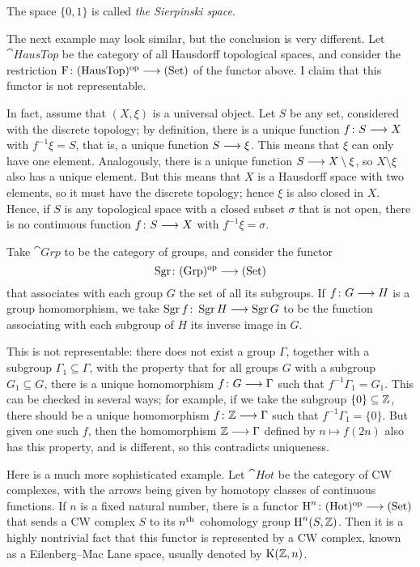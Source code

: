 \begin{2   CONTRAVARIANT FUNCTORS}
\begin{2.1 Yoneda Lemma}
\begin{enumeratei}
The space $\{0,1\}$ is called \emph{the Sierpinski space}.

\item\label{ex:notrep-opensubsets} The next example may look similar, but the conclusion is very different. Let $\cat{HausTop}$ be the category of all Hausdorff topological spaces, and consider the restriction  $\rF\colon \cat{HausTop}\op \arr \catset$ of the functor above. I claim that this functor is not representable. 

In fact, assume that $(X, \xi)$ is a universal object. Let $S$ be any set, considered with the discrete topology; by definition, there is a unique function $f \colon S \arr X$ with $f^{-1} \xi = S$, that is, a unique function $S \arr \xi$. This means that $\xi$ can only have one element. Analogously, there is a unique function $S \arr X \setminus \xi$, so $X \setminus \xi$ also has a unique element. But this means that $X$ is a Hausdorff space with two elements, so it  must have the discrete topology; hence $\xi$ is also closed in $X$. Hence, if $S$ is any topological space with a closed subset $\sigma$ that is not open, there is no continuous function $f\colon S \arr X$ with $f^{-1}{\xi} = \sigma$.

\item Take $\cat{Grp}$ to be the category of groups, and consider the functor 
   \[
   \operatorname{Sgr} \colon \cat{Grp}\op \arr \catset
   \]
that associates with each group $G$ the set of all its subgroups. If $f \colon G \arr H$ is a group homomorphism, we take $\operatorname{Sgr} f \colon \operatorname{Sgr} H \arr \operatorname{Sgr} G$ to be the function associating with each subgroup of $H$ its inverse image in $G$.

This is not representable: there does not exist a group $\Gamma$, together with a subgroup $\Gamma_1 \subseteq \Gamma$, with the property that for all groups $G$ with a subgroup $G_1 \subseteq G$, there is a unique homomorphism $f \colon G \arr \Gamma$ such that $f^{-1} \Gamma_1 = G_1$. This can be checked in several ways; for example, if we take the subgroup $\{0\} \subseteq \mathbb{Z}$, there should be a unique homomorphism $f \colon \ZZ \arr \Gamma$ such that $f ^{-1} \Gamma_1 = \{0\}$. But given one such $f$, then the homomorphism $\ZZ \arr \Gamma$ defined by $n \mapsto f(2n)$ also has this property, and is different, so this contradicts uniqueness.

\item Here is a much more sophisticated example. Let $\cat{Hot}$ be the category of CW complexes, with the arrows being given by homotopy classes of continuous functions. If $n$ is a fixed natural number, there is a functor $\H^n \colon \cat{Hot}\op \arr \catset$ that sends a CW complex $S$ to its $n^\text{th}$ cohomology group $\operatorname{H}^n(S, \mathbb{Z})$. Then it is a highly nontrivial fact that this functor is represented by a CW complex, known as a Eilenberg--Mac Lane space, usually denoted by $\mathrm{K}( \mathbb{Z}, n)$.


\end{enumeratei}
\end{2.1 Yoneda Lemma}
\end{2   CONTRAVARIANT FUNCTORS}

